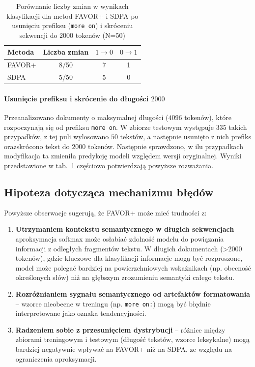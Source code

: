 \documentclass[a4paper,11pt,twoside]{report}
\theoremstyle{definition}
\begin{document}
\begin{table}[h]
\centering
\caption{Porównanie liczby zmian w wynikach klasyfikacji dla metod FAVOR+ i SDPA po usunięciu prefiksu (\texttt{more on}) i skróceniu sekwencji do $2000$ tokenów (N=$50$)}
\smallskip
\label{tab:hyper-predict-change}
\begin{tabular}{lccc}
\hline
\textbf{Metoda} & \textbf{Liczba zmian} & \textbf{$1 \rightarrow 0$} & \textbf{$0 \rightarrow 1$} \\
\hline
FAVOR+ & 8/50 & 7 & 1 \\
SDPA   & 5/50 & 5 & 0 \\
\hline
\end{tabular}
\end{table}

\paragraph{Usunięcie prefiksu i skrócenie do długości $2000$}
Przeanalizowano dokumenty o maksymalnej długości ($4096$ tokenów), które rozpoczynają się od prefiksu \texttt{more on}. W zbiorze testowym występuje $335$ takich przypadków, z tej puli wylosowano $50$ tekstów, a następnie usunięto z nich prefiks orazskrócono tekst do $2000$ tokenów. Następnie sprawdzono, w ilu przypadkach modyfikacja ta zmieniła predykcję modeli względem wersji oryginalnej. Wyniki przedstawione w tab.~\ref{tab:hyper-predict-change} częściowo potwierdzają powyższe rozważania.





\subsection{Hipoteza dotycząca mechanizmu błędów}
Powyższe obserwacje sugerują, że FAVOR+ może mieć trudności z:
\begin{enumerate}
    \item \textbf{Utrzymaniem kontekstu semantycznego w długich sekwencjach} -- aproksymacja softmax może osłabiać zdolność modelu do powiązania informacji z odległych fragmentów tekstu. W długich dokumentach (>2000 tokenów), gdzie kluczowe dla klasyfikacji informacje mogą być rozproszone, model może polegać bardziej na powierzchniowych wskaźnikach (np. obecność określonych słów) niż na głębszym zrozumieniu semantyki całego tekstu.
    
    \item \textbf{Rozróżnianiem sygnału semantycznego od artefaktów formatowania} -- wzorce nieobecne w treningu (np. \texttt{more on:}) mogą być błędnie interpretowane jako oznaka tendencyjności.
    
    \item \textbf{Radzeniem sobie z przesunięciem dystrybucji} -- różnice między zbiorami treningowym i testowym (długość tekstów, wzorce leksykalne) mogą bardziej negatywnie wpływać na FAVOR+ niż na SDPA, ze względu na ograniczenia aproksymacji.
\end{enumerate}
\end{document}
